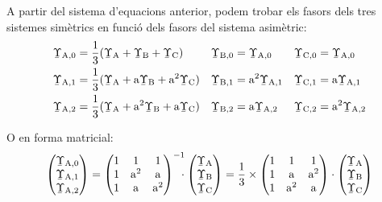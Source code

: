A partir del sistema d'equacions anterior, podem trobar els fasors
dels tres sistemes simètrics en funció dels fasors del sistema
asimètric:
\begin{subequations}
\begin{align}
   \cmplx{\Upsilon}\ped{A,0} &= \frac{1}{3} (\cmplx{\Upsilon}\ped{A} + \cmplx{\Upsilon}\ped{B} +
   \cmplx{\Upsilon}\ped{C}) & \cmplx{\Upsilon}\ped{B,0} &= \cmplx{\Upsilon}\ped{A,0} &
   \cmplx{\Upsilon}\ped{C,0} &= \cmplx{\Upsilon}\ped{A,0}
   \label{eq:c_sim_c2}\\
   \cmplx{\Upsilon}\ped{A,1} &= \frac{1}{3} (\cmplx{\Upsilon}\ped{A} + \au \cmplx{\Upsilon}\ped{B} +
   \au^2 \cmplx{\Upsilon}\ped{C}) & \cmplx{\Upsilon}\ped{B,1} &= \au^2 \cmplx{\Upsilon}\ped{A,1} &
   \cmplx{\Upsilon}\ped{C,1} &= \au \cmplx{\Upsilon}\ped{A,1} \label{eq:c_sim_a2} \\
   \cmplx{\Upsilon}\ped{A,2} &= \frac{1}{3} (\cmplx{\Upsilon}\ped{A} + \au^2 \cmplx{\Upsilon}\ped{B} +
   \au \cmplx{\Upsilon}\ped{C}) & \cmplx{\Upsilon}\ped{B,2} &= \au \cmplx{\Upsilon}\ped{A,2} &
   \cmplx{\Upsilon}\ped{C,2} &= \au^2 \cmplx{\Upsilon}\ped{A,2} \label{eq:c_sim_b2}
\end{align}
\end{subequations}

O en forma matricial:
\begin{equation}\label{eq:c_sim_mat1}
   \begin{pmatrix}
     \cmplx{\Upsilon}\ped{A,0} \\
     \cmplx{\Upsilon}\ped{A,1} \\
     \cmplx{\Upsilon}\ped{A,2}
   \end{pmatrix} =
   \begin{pmatrix}
     1 & 1 & 1 \\
     1 & \au^2 & \au\\
     1 & \au & \au^2
   \end{pmatrix}^{-1} \hspace{-2mm}\cdot
   \begin{pmatrix}
     \cmplx{\Upsilon}\ped{A} \\
     \cmplx{\Upsilon}\ped{B} \\
     \cmplx{\Upsilon}\ped{C}
   \end{pmatrix} =  \frac{1}{3} \times
   \begin{pmatrix}
     1 & 1 & 1 \\
     1 & \au & \au^2 \\
     1 & \au^2 & \au
   \end{pmatrix} \cdot
   \begin{pmatrix}
     \cmplx{\Upsilon}\ped{A} \\
     \cmplx{\Upsilon}\ped{B} \\
     \cmplx{\Upsilon}\ped{C}
   \end{pmatrix}
\end{equation}

